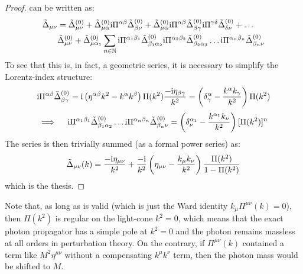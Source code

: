 \begin{proofbox}
  \begin{proof}
     can be written as:
    \begin{equation*}
      \begin{split}
        \tilde{\Delta}_{\mu \nu}
        & = \tilde{\Delta}_{\mu \nu}^{(0)} + \tilde{\Delta}_{\mu \alpha}^{(0)} \mathrm{i} \Pi^{\alpha \beta} \tilde{\Delta}_{\beta \nu}^{(0)} + \tilde{\Delta}_{\mu \alpha}^{(0)} \mathrm{i} \Pi^{\alpha \beta} \tilde{\Delta}_{\beta \gamma}^{(0)} \mathrm{i} \Pi^{\gamma \delta} \tilde{\Delta}_{\delta \nu}^{(0)} + \dots \\
        & \tilde{\Delta}_{\mu \nu}^{(0)} + \tilde{\Delta}_{\mu \alpha_1}^{(0)} \sum_{n \in \mathbb{N}} \mathrm{i} \Pi^{\alpha_1 \beta_1} \tilde{\Delta}_{\beta_1 \alpha_2}^{(0)} \mathrm{i} \Pi^{\alpha_2 \beta_2} \tilde{\Delta}_{\beta_2 \alpha_3}^{(0)} \dots \mathrm{i} \Pi^{\alpha_n \beta_n} \tilde{\Delta}_{\beta_n \nu}^{(0)}
      \end{split}
    \end{equation*}
    To see that this is, in fact, a geometric series, it is necessary to simplify the Lorentz-index structure:
    \begin{equation*}
      \mathrm{i} \Pi^{\alpha \beta} \tilde{\Delta}_{\beta \gamma}^{(0)} = \mathrm{i} \left( \eta^{\alpha \beta} k^2 - k^\alpha k^\beta \right) \Pi(k^2) \frac{- \mathrm{i} \eta_{\beta \gamma}}{k^2} = \left( \delta^\alpha_\gamma - \frac{k^\alpha k_\gamma}{k^2} \right) \Pi(k^2)
    \end{equation*}
    \begin{equation*}
      \implies \quad
      \mathrm{i} \Pi^{\alpha_1 \beta_1} \tilde{\Delta}_{\beta_1 \alpha_2}^{(0)} \dots \mathrm{i} \Pi^{\alpha_n \beta_n} \tilde{\Delta}_{\beta_n \nu}^{(0)} = \left( \delta^{\alpha_1}_{\nu} - \frac{k^{\alpha_1} k_\nu}{k^2} \right) [\Pi(k^2)]^n
    \end{equation*}
    The series is then trivially summed (as a formal power series) as:
    \begin{equation*}
      \tilde{\Delta}_{\mu \nu}(k) = \frac{- \mathrm{i} \eta_{\mu \nu}}{k^2} + \frac{- \mathrm{i}}{k^2} \left( \eta_{\mu \nu} - \frac{k_\mu k_\nu}{k^2} \right) \frac{\Pi(k^2)}{1 - \Pi(k^2)}
    \end{equation*}
    which is the thesis.
  \end{proof}
\end{proofbox}

Note that, as long as  is valid (which is just the Ward identity $ k_\mu \Pi^{\mu \nu}(k) = 0 $), then $ \Pi(k^2) $ is regular on the light-cone $ k^2 = 0 $, which means that the exact photon propagator has a simple pole at $ k^2 = 0 $ and the photon remains massless at all orders in perturbation theory. On the contrary, if $ \Pi^{\mu \nu}(k) $ contained a term like $ M^2 \eta^{\mu \nu} $ without a compensating $ k^\mu k^\nu $ term, then the photon mass would be shifted to $ M $.

